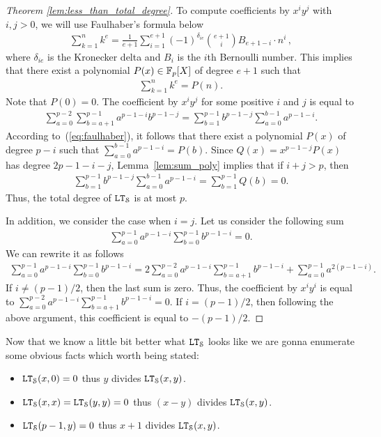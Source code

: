 \begin{proof}[Theorem \ref{lem:less_than_total_degree}]
    To compute coefficients by $x^i y^j$ with $i, j > 0$, we will use Faulhaber's formula below
    \begin{align*}
      \sum_{k=1}^n k^e = \frac{1}{e+1} \sum_{i=1}^{e+1} (-1)^{\delta_{ie}} \binom{e+1}{i} B_{e+1-i} \cdot n^i\,,
    \end{align*}
    where $\delta_{ie}$ is the Kronecker delta and $B_{i}$ is the $i$th Bernoulli number.
    This implies that there exist a polynomial $P(x) \in \mathbb{F}_p[X]$ of degree $e+1$ such that
    \begin{align}\label{eq:faulhaber}
      \sum_{k=1}^n k^e = P(n).
    \end{align}
    Note that $P(0) = 0$.
    The coefficient by $x^i y^j$ for some positive $i$ and $j$ is equal to
    \begin{align*}
      \sum_{a = 0}^{p-2} \sum_{b=a+1}^{p-1} a^{p-1-i} b^{p-1-j} = \sum_{b = 1}^{p-1} b^{p-1-j} \sum_{a=0}^{b-1} a^{p-1-i}.
    \end{align*}
    According to~(\ref{eq:faulhaber}), it follows that there exist a polynomial $P(x)$ of degree $p-i$ such that $\sum_{a=0}^{b-1} a^{p-1-i} = P(b)$.
    Since $Q(x) = x^{p-1-j} P(x)$ has degree $2p-1-i-j$, Lemma~\ref{lem:sum_poly} implies that if $i+j > p$, then
    \begin{align*}
      \sum_{b = 1}^{p-1} b^{p-1-j} \sum_{a=0}^{b-1} a^{p-1-i} = \sum_{b=1}^{p-1} Q(b) = 0.
    \end{align*}
    Thus, the total degree of $\mathtt{LT}_{\mathcal{S}}$ is at most $p$.

    In addition, we consider the case when $i = j$.
    Let us consider the following sum
    \begin{align*}
      \sum_{a=0}^{p-1} a^{p-1-i} \sum_{b=0}^{p-1} b^{p-1-i} = 0.
    \end{align*}
    We can rewrite it as follows
    \begin{align*}
      \sum_{a=0}^{p-1} a^{p-1-i} \sum_{b=0}^{p-1} b^{p-1-i} = 2\sum_{a=0}^{p-2} a^{p-1-i} \sum_{b=a+1}^{p-1} b^{p-1-i} + \sum_{a=0}^{p-1} a^{2(p-1-i)}.
    \end{align*}
    If $i \ne (p-1)/2$, then the last sum is zero.
    Thus, the coefficient by $x^i y^i$ is equal to $\sum_{a=0}^{p-2} a^{p-1-i} \sum_{b=a+1}^{p-1} b^{p-1-i} = 0$.
    If $i = (p-1)/2$, then following the above argument, this coefficient is equal to $-(p-1)/2$.
  \end{proof}

  Now that we know a little bit better what $\mathtt{LT}_{\mathcal{S}}$ looks like we are gonna enumerate some obvious facts which worth being stated:
  \begin{itemize}
  \item $\mathtt{LT}_{\mathcal{S}}(x,0) = 0$ thus $y$ divides $\mathtt{LT}_{\mathcal{S}}(x,y)$.
  \item $\mathtt{LT}_{\mathcal{S}}(x,x) = \mathtt{LT}_{\mathcal{S}}(y,y) = 0$ thus $(x-y)$ divides $\mathtt{LT}_{\mathcal{S}}(x,y)$.
  \item $\mathtt{LT}_{\mathcal{S}}(p-1,y) = 0$ thus $x+1$ divides $\mathtt{LT}_{\mathcal{S}}(x,y)$.
  \end{itemize}

